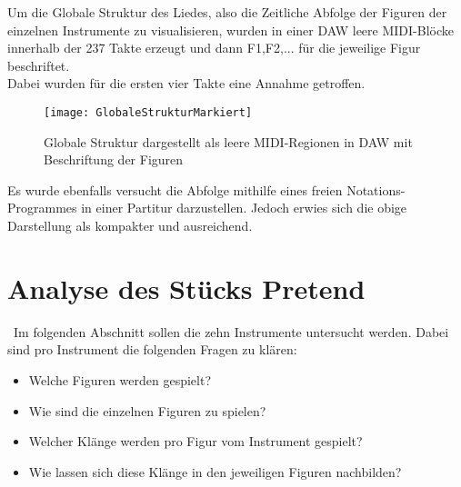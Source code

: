 \documentclass[
10pt, %
a4paper, %
oneside, %
headinclude,footinclude, %
BCOR5mm, %
]{scrartcl}
\begin{document}
\noindent Um die Globale Struktur des Liedes, also die Zeitliche Abfolge der Figuren der einzelnen Instrumente zu visualisieren, wurden in einer DAW leere MIDI-Blöcke innerhalb der 237 Takte erzeugt und dann F1,F2,... für die jeweilige Figur beschriftet.\\
Dabei wurden für die ersten vier Takte eine Annahme getroffen.

\begin{figure}[h]
	\centering 
	\texttt{[image: GlobaleStrukturMarkiert]} 
	\caption{Globale Struktur dargestellt als leere MIDI-Regionen in DAW mit Beschriftung der Figuren}
\end{figure}

\noindent Es wurde ebenfalls versucht die Abfolge mithilfe eines freien Notations-Programmes in einer Partitur darzustellen. Jedoch erwies sich die obige Darstellung als kompakter und ausreichend.

\section{Analyse des Stücks Pretend}\
Im folgenden Abschnitt sollen die zehn Instrumente untersucht werden. Dabei sind pro Instrument die folgenden Fragen zu klären:

\begin{itemize}
	\itemsep0em
	\item Welche Figuren werden gespielt?
	\item Wie sind die einzelnen Figuren zu spielen?
	\item Welcher Klänge werden pro Figur vom Instrument gespielt?
	\item Wie lassen sich diese Klänge in den jeweiligen Figuren nachbilden?
\end{itemize}

%
%
%
\end{document}
